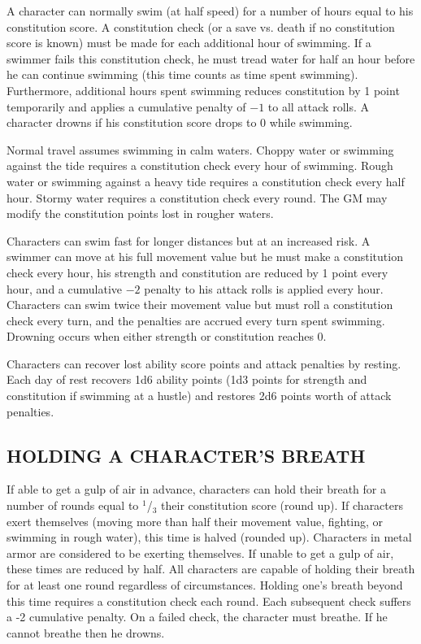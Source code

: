 \begin{multicols}{2}
A character can normally swim (at half speed) for a number of hours equal to his constitution score.  A constitution check (or a save vs. death if no constitution score is known) must be made for each additional hour of swimming.  If a swimmer fails this constitution check, he must tread water for half an hour before he can continue swimming (this time counts as time spent swimming).  Furthermore, additional hours spent swimming reduces constitution by 1 point temporarily and applies a cumulative penalty of $-1$ to all attack rolls.  A character drowns if his constitution score drops to 0 while swimming.  

Normal travel assumes swimming in calm waters.  Choppy water or swimming against the tide requires a constitution check every hour of swimming.  Rough water or swimming against a heavy tide requires a constitution check every half hour.  Stormy water requires a constitution check every round.  The GM may modify the constitution points lost in rougher waters.

Characters can swim fast for longer distances but at an increased risk.  A swimmer can move at his full movement value but he must make a constitution check every hour, his strength and constitution are reduced by 1 point every hour, and a cumulative $-2$ penalty to his attack rolls is applied every hour.  Characters can swim twice their movement value but must roll a constitution check every turn, and the penalties are accrued every turn spent swimming.  Drowning occurs when either strength or constitution reaches 0.

Characters can recover lost ability score points and attack penalties by resting.  Each day of rest recovers 1d6 ability points (1d3 points for strength and constitution if swimming at a hustle) and restores 2d6 points worth of attack penalties.  

\subsection{HOLDING A CHARACTER'S BREATH}

If able to get a gulp of air in advance, characters can hold their breath for a number of rounds equal to $^1$/$_3$ their constitution score (round up).  If characters exert themselves (moving more than half their movement value, fighting, or swimming in rough water), this time is halved (rounded up).  Characters in metal armor are considered to be exerting themselves.  If unable to get a gulp of air, these times are reduced by half.  All characters are capable of holding their breath for at least one round regardless of circumstances.  Holding one's breath beyond this time requires a constitution check each round.  Each subsequent check suffers a -2 cumulative penalty.  On a failed check, the character must breathe.  If he cannot breathe then he drowns.


\end{multicols}
